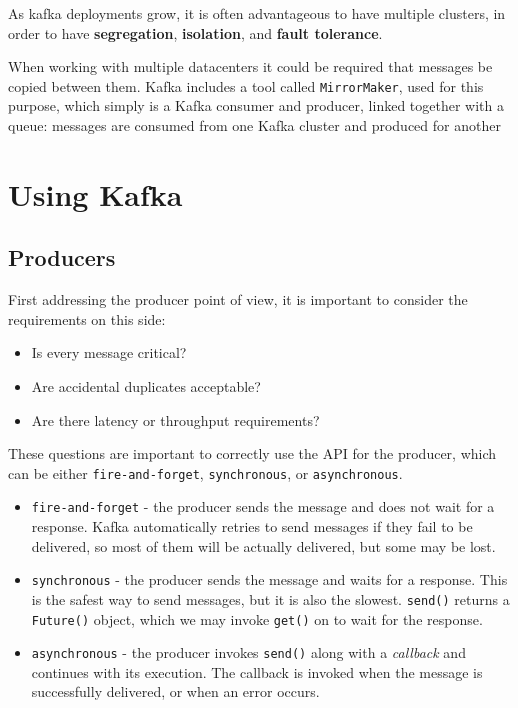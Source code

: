 As kafka deployments grow, it is often advantageous to have multiple clusters, in order to have \textbf{segregation}, \textbf{isolation}, and \textbf{fault tolerance}.

When working with multiple datacenters
it could be required that messages be
copied between them.
Kafka includes a tool called \texttt{MirrorMaker},
used for this purpose, which simply is a Kafka consumer and producer, linked together with a queue:
messages are consumed from one Kafka cluster and produced for another

\section{Using Kafka}


\subsection{Producers}
First addressing the producer point of view, it is important to consider the requirements on this side:
\begin{itemize}
   \item Is every message critical?
   \item Are accidental duplicates acceptable?
   \item Are there latency or throughput requirements?
\end{itemize}
These questions are important to correctly use the API for the producer, which can be either \texttt{fire-and-forget}, \texttt{synchronous}, or \texttt{asynchronous}.

\begin{itemize}
   \item \texttt{fire-and-forget} - the producer sends the message and does not wait for a response. Kafka automatically retries to send messages if they fail to be delivered, so most of them will be actually delivered, but some may be lost.
   \item \texttt{synchronous} - the producer sends the message and waits for a response. This is the safest way to send messages, but it is also the slowest.
   \lstinline|send()| returns a \lstinline|Future()| object, which we may invoke \lstinline|get()| on to wait for the response.
   \item \texttt{asynchronous} - the producer invokes \lstinline|send()| along with a \textit{callback} and continues with its execution.
   The callback is invoked when the message is successfully delivered, or when an error occurs.
\end{itemize}

